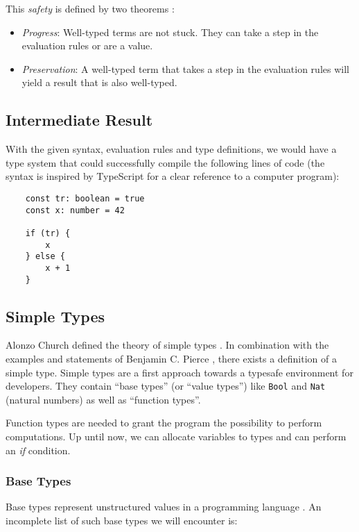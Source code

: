This \textit{safety} is defined by two theorems \cite{pierce2002ProgLang}:
\begin{itemize}
    \item \textit{Progress}: Well-typed terms are not stuck. They can take
          a step in the evaluation rules or are a value.
    \item \textit{Preservation}: A well-typed term that takes a step in the evaluation rules
          will yield a result that is also well-typed.
\end{itemize}

\subsection{Intermediate Result}

With the given syntax, evaluation rules and type definitions, we would
have a type system that could successfully compile the following
lines of code (the syntax is inspired by TypeScript for a clear
reference to a computer program):

\begin{verbatim}
    const tr: boolean = true
    const x: number = 42

    if (tr) {
        x
    } else {
        x + 1
    }
\end{verbatim}

\subsection{Simple Types}

Alonzo Church defined the theory of simple types
\cite{churchLogic}. In combination with the examples and
statements of Benjamin C. Pierce \cite{pierce2002ProgLang}, there
exists a definition of a simple type. Simple types are a first
approach towards a typesafe environment for developers. They
contain ``base types'' (or ``value types'') like \texttt{Bool} and
\texttt{Nat} (natural numbers) as well as ``function types''.

Function types are needed to grant the program the possibility to
perform computations. Up until now, we can allocate variables to
types and can perform an \textit{if} condition.

\subsubsection{Base Types}

Base types represent unstructured values in a programming language \cite{pierce2002ProgLang}.
An incomplete list of such base types we will encounter is:

